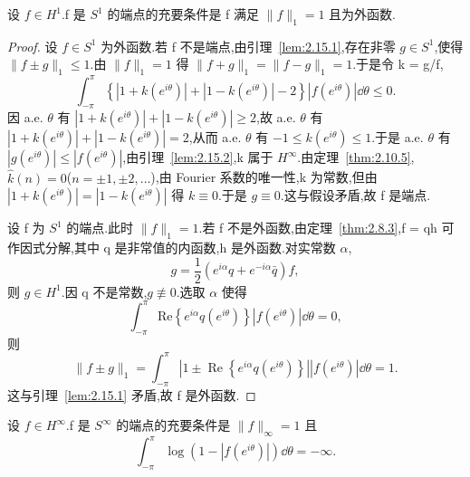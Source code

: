 \begin{theorem}\label{thm:2.15.3}
设 $f \in H^{1}$.f 是 $S^{1}$ 的端点的充要条件是 f 满足 $\|f\|_{1} = 1$ 且为外函数.
\end{theorem}

\begin{proof}
设 $f \in S^{1}$ 为外函数.若 f 不是端点,由引理~\ref{lem:2.15.1},存在非零 $g \in S^{1}$,使得 $\|f \pm g\|_{1} \leq 1$.由 $\|f\|_{1} = 1$ 得 $\|f + g\|_{1} = \|f - g\|_{1} = 1$.于是令 k = g/f,
\begin{equation*}
\int_{-\pi}^{\pi} \left\{|1 + k(e^{i\theta})| + |1 - k(e^{i\theta})| - 2\right\} |f(e^{i\theta})|\dd \theta \leq 0.
\end{equation*}
因 a.e. $\theta$ 有 $|1 + k(e^{i\theta})| + |1 - k(e^{i\theta})| \geq 2$,故 a.e. $\theta$ 有 $|1 + k(e^{i\theta})| + |1 - k(e^{i\theta})| = 2$,从而 a.e. $\theta$ 有 $-1 \leq k(e^{i\theta}) \leq 1$.于是 a.e. $\theta$ 有 $|g(e^{i\theta})| \leq |f(e^{i\theta})|$,由引理~\ref{lem:2.15.2},k 属于 $H^{\infty}$.由定理~\ref{thm:2.10.5},$\hat{k}(n) = 0$($n = \pm 1, \pm 2, \ldots$),由 Fourier 系数的唯一性,k 为常数,但由 $|1 + k(e^{i\theta})| = |1 - k(e^{i\theta})|$ 得 $k \equiv 0$.于是 $g \equiv 0$.这与假设矛盾,故 f 是端点.

设 f 为 $S^{1}$ 的端点.此时 $\|f\|_{1} = 1$.若 f 不是外函数,由定理~\ref{thm:2.8.3},f = qh 可作因式分解,其中 q 是非常值的内函数,h 是外函数.对实常数 $\alpha$,
\begin{equation*}
g = \frac{1}{2}(e^{i\alpha}q + e^{-i\alpha}\bar{q})f,
\end{equation*}
则 $g \in H^{1}$.因 q 不是常数,$g \not\equiv 0$.选取 $\alpha$ 使得
\begin{equation*}
\int_{-\pi}^{\pi} \mathrm{Re}\left\{e^{i\alpha}q(e^{i\theta})\right\} |f(e^{i\theta})|\dd \theta = 0,
\end{equation*}
则
\begin{equation*}
\|f \pm g\|_{1} = \int_{-\pi}^{\pi} |1 \pm \operatorname{Re}\left\{e^{i\alpha}q(e^{i\theta})\right\}| |f(e^{i\theta})|\dd \theta = 1.
\end{equation*}
这与引理~\ref{lem:2.15.1} 矛盾,故 f 是外函数.
\end{proof}

\begin{theorem}\label{thm:2.15.4}
设 $f \in H^{\infty}$.f 是 $S^{\infty}$ 的端点的充要条件是 $\|f\|_{\infty} = 1$ 且
\begin{equation*}
\int_{-\pi}^{\pi} \log(1 - |f(e^{i\theta})|)\dd \theta = -\infty.
\end{equation*}
\end{theorem}

